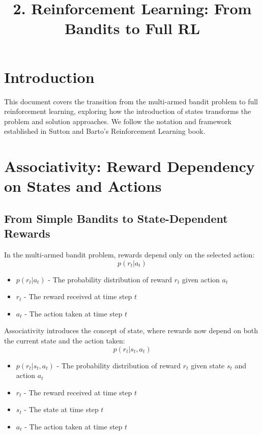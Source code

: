 \documentclass[12pt,a4paper]{article}
\title{2. Reinforcement Learning: From Bandits to Full RL}
\begin{document}
\maketitle
\tableofcontents
\newpage

\section{Introduction}
This document covers the transition from the multi-armed bandit problem to full reinforcement learning, exploring how the introduction of states transforms the problem and solution approaches. We follow the notation and framework established in Sutton and Barto's Reinforcement Learning book.

\section{Associativity: Reward Dependency on States and Actions}
\subsection{From Simple Bandits to State-Dependent Rewards}

In the multi-armed bandit problem, rewards depend only on the selected action:
\begin{equation}
p(r_t|a_t)
\end{equation}

\begin{tcolorbox}[title=Notation Overview]
\begin{itemize}
    \item $p(r_t|a_t)$ - The probability distribution of reward $r_t$ given action $a_t$
    \item $r_t$ - The reward received at time step $t$
    \item $a_t$ - The action taken at time step $t$
\end{itemize}
\end{tcolorbox}

Associativity introduces the concept of state, where rewards now depend on both the current state and the action taken:
\begin{equation}
p(r_t|s_t, a_t)
\end{equation}

\begin{tcolorbox}[title=Notation Overview]
\begin{itemize}
    \item $p(r_t|s_t, a_t)$ - The probability distribution of reward $r_t$ given state $s_t$ and action $a_t$
    \item $r_t$ - The reward received at time step $t$
    \item $s_t$ - The state at time step $t$
    \item $a_t$ - The action taken at time step $t$
\end{itemize}
\end{tcolorbox}
\end{document}
